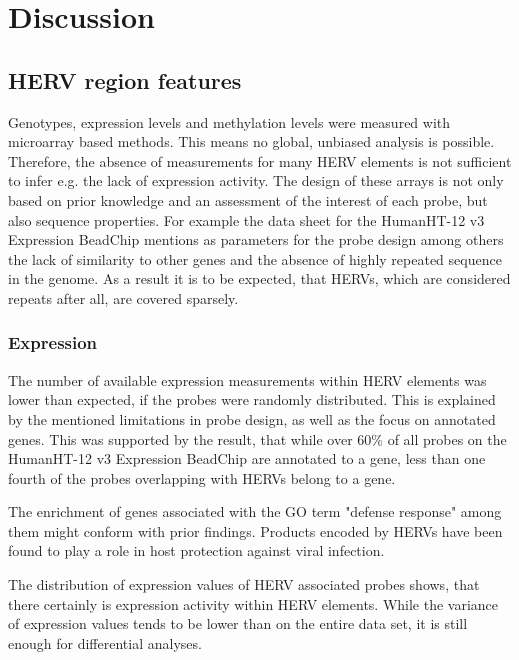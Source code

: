 \documentclass[a4paper,12pt,twoside,openright]{report}
\begin{document}
\newpage
\chapter{Discussion}
\label{Discussion}

\section{HERV region features}
\label{Discussion:HERV region features}

Genotypes, expression levels and methylation levels were measured with microarray based methods. This means no global, unbiased analysis is possible. Therefore, the absence of measurements for many HERV elements is not sufficient to infer e.g. the lack of expression activity. The design of these arrays is not only based on prior knowledge and an assessment of the interest of each probe, but also sequence properties. For example the data sheet for the HumanHT-12 v3 Expression BeadChip\cite{HumanHT} mentions as parameters for the probe design among others the lack of similarity to other genes and the absence of highly repeated sequence in the genome. As a result it is to be expected, that HERVs, which are considered repeats after all, are covered sparsely. 

\subsection{Expression}
\label{Discussion:Expression}
The number of available expression measurements within HERV elements was lower than expected, if the probes were randomly distributed. This is explained by the mentioned limitations in probe design, as well as the focus on annotated genes. This was supported by the result, that while over 60\% of all probes on the HumanHT-12 v3 Expression BeadChip are annotated to a gene, less than one fourth of the probes overlapping with HERVs belong to a gene.

The enrichment of genes associated with the GO term "defense response" among them might conform with prior findings. Products encoded by HERVs have been found to play a role in host protection against viral infection\cite{Malfavon-Borja2015}.

The distribution of expression values of HERV associated probes shows, that there certainly is expression activity within HERV elements. While the variance of expression values tends to be lower than on the entire data set, it is still enough for differential analyses. 
\end{document}
